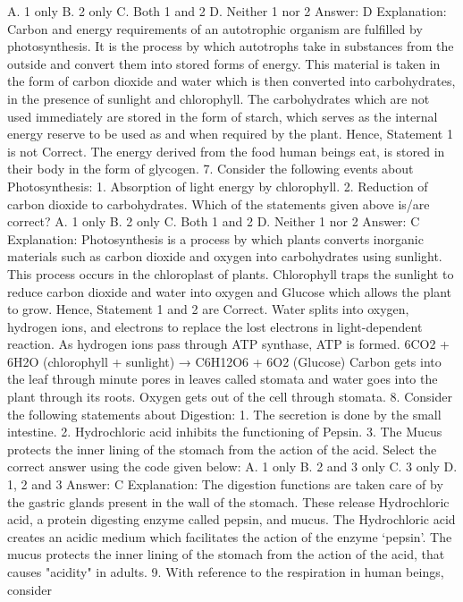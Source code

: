 A. 1 only
B. 2 only
C. Both 1 and 2
D. Neither 1 nor 2
Answer: D
Explanation: Carbon and energy requirements of an autotrophic
organism are fulfilled by photosynthesis. It is the process by which
autotrophs take in substances from the outside and convert them
into stored forms of energy. This material is taken in the form of
carbon dioxide and water which is then converted into
carbohydrates, in the presence of sunlight and chlorophyll.
The carbohydrates which are not used immediately are stored in the
form of starch, which serves as the internal energy reserve to be
used as and when required by the plant. Hence, Statement 1 is not
Correct. The energy derived from the food human beings eat, is
stored in their body in the form of glycogen.
7. Consider the following events about Photosynthesis:
1. Absorption of light energy by chlorophyll.
2. Reduction of carbon dioxide to carbohydrates.
Which of the statements given above is/are correct?
A. 1 only
B. 2 only
C. Both 1 and 2
D. Neither 1 nor 2
Answer: C
Explanation: Photosynthesis is a process by which plants converts
inorganic materials such as carbon dioxide and oxygen into
carbohydrates using sunlight. This process occurs in the chloroplast
of plants. Chlorophyll traps the sunlight to reduce carbon dioxide
and water into oxygen and Glucose which allows the plant to
grow. Hence, Statement 1 and 2 are Correct. Water splits into
oxygen, hydrogen ions, and electrons to replace the lost electrons in
light-dependent reaction. As hydrogen ions pass through ATP
synthase, ATP is formed.
6CO2 + 6H2O (chlorophyll + sunlight) → C6H12O6 + 6O2
(Glucose)
Carbon gets into the leaf through minute pores in leaves called
stomata and water goes into the plant through its roots. Oxygen
gets out of the cell through stomata.
8. Consider the following statements about Digestion:
1. The secretion is done by the small intestine.
2. Hydrochloric acid inhibits the functioning of Pepsin.
3. The Mucus protects the inner lining of the stomach from the
action of the acid.
Select the correct answer using the code given below:
A. 1 only
B. 2 and 3 only
C. 3 only
D. 1, 2 and 3
Answer: C
Explanation: The digestion functions are taken care of by the
gastric glands present in the wall of the stomach. These release
Hydrochloric acid, a protein digesting enzyme called pepsin, and
mucus. The Hydrochloric acid creates an acidic medium which
facilitates the action of the enzyme ‘pepsin’. The mucus protects the
inner lining of the stomach from the action of the acid, that causes
"acidity" in adults.
9. With reference to the respiration in human beings, consider
